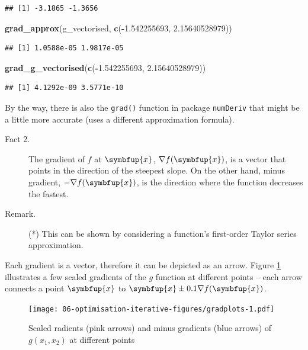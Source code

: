\documentclass[10pt,b5paper,krantz1]{krantz}
\newenvironment{Shaded}{\begin{snugshade}}{\end{snugshade}}
\newcommand{\FloatTok}[1]{\textcolor[rgb]{0.06,0.06,0.06}{#1}}
\newcommand{\KeywordTok}[1]{\textcolor[rgb]{0.27,0.27,0.27}{\textbf{#1}}}
\newcommand{\NormalTok}[1]{#1}
\newcommand{\OperatorTok}[1]{\textcolor[rgb]{0.43,0.43,0.43}{\textbf{#1}}}
\renewcommand{\mathbf}[1]{\symbfup{#1}}
\begin{document}
\begin{verbatim}
## [1] -3.1865 -1.3656
\end{verbatim}

\begin{Shaded}
\begin{Highlighting}[]
\KeywordTok{grad_approx}\NormalTok{(g_vectorised, }\KeywordTok{c}\NormalTok{(}\OperatorTok{-}\FloatTok{1.542255693}\NormalTok{, }\FloatTok{2.15640528979}\NormalTok{))}
\end{Highlighting}
\end{Shaded}

\begin{verbatim}
## [1] 1.0588e-05 1.9817e-05
\end{verbatim}

\begin{Shaded}
\begin{Highlighting}[]
\KeywordTok{grad_g_vectorised}\NormalTok{(}\KeywordTok{c}\NormalTok{(}\OperatorTok{-}\FloatTok{1.542255693}\NormalTok{, }\FloatTok{2.15640528979}\NormalTok{))}
\end{Highlighting}
\end{Shaded}

\begin{verbatim}
## [1] 4.1292e-09 3.5771e-10
\end{verbatim}

By the way, there is also the \texttt{grad()} function in package \texttt{numDeriv}
that might be a little more accurate (uses a different approximation
formula).

\begin{description}
\item[Fact 2.]
The gradient of \(f\) at \(\mathbf{x}\), \(\nabla f(\mathbf{x})\),
is a vector that points in the direction of the steepest slope.
On the other hand, minus gradient, \(-\nabla f(\mathbf{x})\), is the direction where the function decreases the fastest.
\item[Remark.]
(*) This can be shown by considering a function's first-order Taylor series approximation.
\end{description}

Each gradient is a vector, therefore it can be depicted as an arrow.
Figure \ref{fig:gradplots} illustrates a few scaled gradients of the \(g\)
function at different points -- each arrow connects a point
\(\mathbf{x}\) to \(\mathbf{x}\pm 0.1\nabla f(\mathbf{x})\).

\begin{figure}
\hypertarget{fig:gradplots}{%
\centering
\texttt{[image: 06-optimisation-iterative-figures/gradplots-1.pdf]}
\caption{Scaled radients (pink arrows) and minus gradients (blue arrows) of \(g(x_1,x_2)\) at different points}\label{fig:gradplots}
}
\end{figure}
\end{document}
